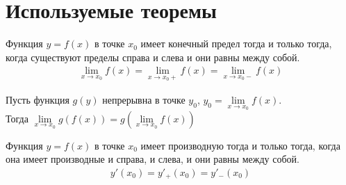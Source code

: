 


\newpage
\section{Используемые теоремы}

\begin{theorem}
  Функция $y = f(x)$ в точке  $x_0$ имеет конечный предел тогда и только тогда, когда существуют пределы справа и слева и они равны между собой.
  \begin{gather*}
    \lim_{x \to x_0} f(x) = \lim_{x \to x_0+} f(x) = \lim_{x \to x_0-} f(x) 
  \end{gather*}
\end{theorem}

\begin{theorem}
  Пусть функция $g(y)$ непрерывна в точке $y_0$, $y_0 = \lim\limits_{x\to x_0}f(x)$.\\
  Тогда $\lim\limits_{x\to x_0}g(f(x)) = g\left(\lim\limits_{x\to x_0}f(x)\right)$
\end{theorem}

\begin{theorem}
  Функция $y = f(x)$ в точке $x_0$ имеет производную тогда и только тогда, когда она имеет производные и справа, и слева, и они равны между собой.
  \begin{align*}
    y'(x_0) = y'_+(x_0)=y'_-(x_0)
  \end{align*}
\end{theorem}

